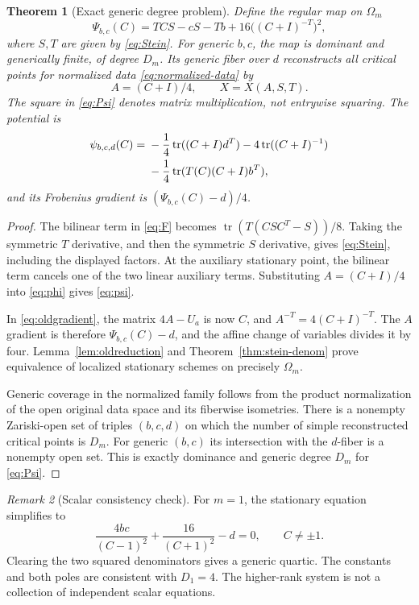 \documentclass[11pt]{article}
\newtheorem{theorem}{Theorem}[section]
\theoremstyle{remark}\newtheorem{remark}[theorem]{Remark}
\DeclareMathOperator{\tr}{tr}
\begin{document}
\begin{theorem}[Exact generic degree problem]\label{thm:map}
Define the regular map on $\Omega_m$
\begin{equation}\label{eq:Psi}
\boxed{\Psi_{b,c}(C)=TCS-cS-Tb+16\bigl((C+I)^{-T}\bigr)^2,}
\end{equation}
where $S,T$ are given by \eqref{eq:Stein}. For generic $b,c$, the map is dominant and generically finite, of degree $D_m$. Its generic fiber over $d$ reconstructs all critical points for normalized data \eqref{eq:normalized-data} by
\[
A=(C+I)/4,\qquad X=X(A,S,T).
\]
The square in \eqref{eq:Psi} denotes matrix multiplication, not entrywise squaring. The potential is
\begin{align}\label{eq:psi}
\psi_{b,c,d}(C)={}&-\frac14\tr((C+I)d^T)-4\tr((C+I)^{-1})\notag\\
&-\frac14\tr(T(C)(C+I)b^T),
\end{align}
and its Frobenius gradient is $(\Psi_{b,c}(C)-d)/4$.
\end{theorem}
\begin{proof}
The bilinear term in \eqref{eq:F} becomes $\tr(T(CSC^T-S))/8$. Taking the symmetric $T$ derivative, and then the symmetric $S$ derivative, gives \eqref{eq:Stein}, including the displayed factors. At the auxiliary stationary point, the bilinear term cancels one of the two linear auxiliary terms. Substituting $A=(C+I)/4$ into \eqref{eq:phi} gives \eqref{eq:psi}.

In \eqref{eq:oldgradient}, the matrix $4A-U_a$ is now $C$, and $A^{-T}=4(C+I)^{-T}$. The $A$ gradient is therefore $\Psi_{b,c}(C)-d$, and the affine change of variables divides it by four. Lemma~\ref{lem:oldreduction} and Theorem~\ref{thm:stein-denom} prove equivalence of localized stationary schemes on precisely $\Omega_m$.

Generic coverage in the normalized family follows from the product normalization of the open original data space and its fiberwise isometries. There is a nonempty Zariski-open set of triples $(b,c,d)$ on which the number of simple reconstructed critical points is $D_m$. For generic $(b,c)$ its intersection with the $d$-fiber is a nonempty open set. This is exactly dominance and generic degree $D_m$ for \eqref{eq:Psi}.
\end{proof}

\begin{remark}[Scalar consistency check]
For $m=1$, the stationary equation simplifies to
\[
\frac{4bc}{(C-1)^2}+\frac{16}{(C+1)^2}-d=0,\qquad C\ne\pm1.
\]
Clearing the two squared denominators gives a generic quartic. The constants and both poles are consistent with $D_1=4$. The higher-rank system is not a collection of independent scalar equations.
\end{remark}
\end{document}
